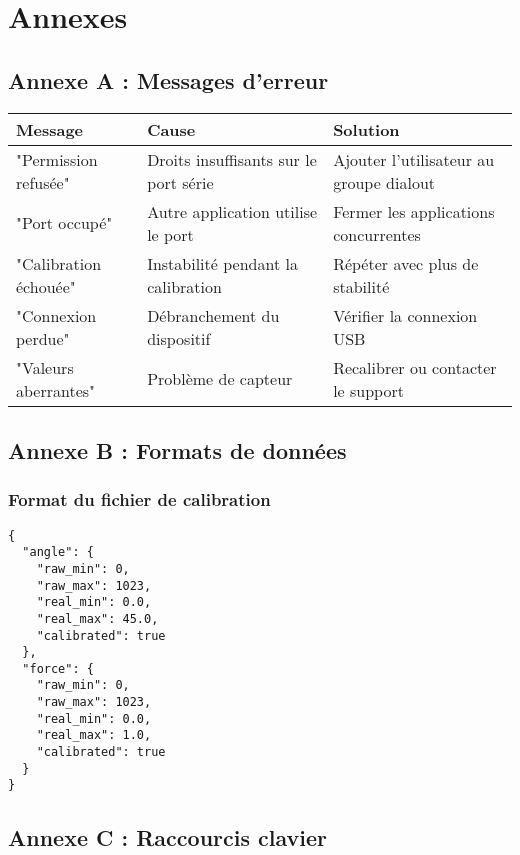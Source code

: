 \documentclass[12pt,a4paper]{article}
\begin{document}
\section{Annexes}

\subsection{Annexe A : Messages d'erreur}

\begin{longtable}{|p{4cm}|p{5cm}|p{5cm}|}
\hline
\textbf{Message} & \textbf{Cause} & \textbf{Solution} \\
\hline
\endhead
"Permission refusée" & Droits insuffisants sur le port série & Ajouter l'utilisateur au groupe dialout \\
\hline
"Port occupé" & Autre application utilise le port & Fermer les applications concurrentes \\
\hline
"Calibration échouée" & Instabilité pendant la calibration & Répéter avec plus de stabilité \\
\hline
"Connexion perdue" & Débranchement du dispositif & Vérifier la connexion USB \\
\hline
"Valeurs aberrantes" & Problème de capteur & Recalibrer ou contacter le support \\
\hline
\end{longtable}

\subsection{Annexe B : Formats de données}

\subsubsection{Format du fichier de calibration}

\begin{lstlisting}
{
  "angle": {
    "raw_min": 0,
    "raw_max": 1023,
    "real_min": 0.0,
    "real_max": 45.0,
    "calibrated": true
  },
  "force": {
    "raw_min": 0,
    "raw_max": 1023,
    "real_min": 0.0,
    "real_max": 1.0,
    "calibrated": true
  }
}
\end{lstlisting}

\subsection{Annexe C : Raccourcis clavier}
\end{document}
